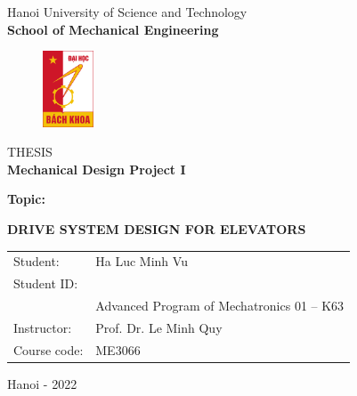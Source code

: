 \documentclass{article} %
\begin{document}
\begin{titlepage}

\begin{center}
\vspace{-12pt}  Hanoi University of Science and Technology \\
\textbf{\fontsize{16pt}{0pt}\selectfont School of Mechanical Engineering}
\vspace{0.5cm}
 \begin{figure}[H]
     \centering
     \includegraphics[width=1.53cm,height=2.26cm]{Image/682px-Logo_Đại_học_Bách_Khoa_Hà_Nội.svg.png}
 \end{figure}
\vspace{1.5cm}
\fontsize{24pt}{0pt}\selectfont THESIS\\
\vspace{24pt}
\textbf{\fontsize{32pt}{0pt}\selectfont Mechanical Design Project I}
\vspace{1.5cm}
\end{center}
\hspace{6pt}\textbf{\fontsize{14pt}{0pt}\selectfont Topic:}
\begin{center}
    \textbf{\fontsize{20pt}{0pt}\selectfont DRIVE SYSTEM DESIGN FOR ELEVATORS}\\
    

\vspace{1.5cm}
\begin{table}[H]
    \centering
    \begin{tabular}{l l}
 \fontsize{14pt}{0pt}\selectfont Student:    & \fontsize{14pt}{0pt}\selectfont Ha Luc Minh Vu \\
 \fontsize{14pt}{0pt}\selectfont Student ID:  & \fontsize{14pt}{0pt}\selectfont 20185317
 
 \vspace{6pt} \\ 
     &\fontsize{14pt}{0pt}\selectfont Advanced Program of Mechatronics 01 – K63 \vspace{6pt}\\
\fontsize{14pt}{0pt}\selectfont Instructor:  & \fontsize{14pt}{0pt}\selectfont Prof. Dr. Le Minh Quy \\
\fontsize{14pt}{0pt}\selectfont Course code: &
\fontsize{14pt}{0pt}\selectfont ME3066
\end{tabular}
\end{table}
\vspace{5cm}
 \fontsize{14pt}{0pt}\selectfont Hanoi - 2022
\end{center}
\cleardoublepage



\end{titlepage}
\end{document}
